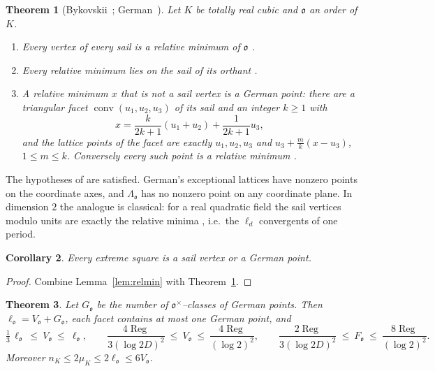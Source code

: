 \documentclass[11pt,reqno]{amsart}
\theoremstyle{plain}
\newtheorem{theorem}{Theorem}[section]
\newtheorem{corollary}[theorem]{Corollary}
\theoremstyle{definition}
\newcommand{\conv}{\operatorname{conv}}
\newcommand{\Reg}{\operatorname{Reg}}
\newcommand{\Ok}{\mathfrak{o}}
\newcommand{\nK}{n_K}
\newcommand{\muK}{\mu_K}
\begin{document}
\begin{theorem}[Bykovskii~\cite{Bykovskii}; German~\cite{German}]\label{thm:bg}
Let $K$ be totally real cubic and $\Ok$ an order of $K$.
\begin{enumerate}[label=\textup{(\alph*)},leftmargin=2.2em]
\item Every vertex of every sail is a relative minimum of $\Ok$ \textup{\cite[Theorem]{Bykovskii}}.
\item Every relative minimum lies on the sail of its orthant \textup{\cite[Thm.~1]{German}}.
\item A relative minimum $x$ that is not a sail vertex is a \emph{German point}: there are a triangular facet
$\conv(u_1,u_2,u_3)$ of its sail and an integer $k\ge1$ with
\[
x=\frac{k}{2k+1}(u_1+u_2)+\frac1{2k+1}u_3,
\]
and the lattice points of the facet are exactly $u_1,u_2,u_3$ and $u_3+\tfrac mk(x-u_3)$, $1\le m\le k$.
Conversely every such point is a relative minimum \textup{\cite[Cor.~2, Thm.~2, Cor.~3]{German}}.
\end{enumerate}
\end{theorem}

The hypotheses of \cite[Thm.~1, Cor.~3]{German} are satisfied. German's exceptional lattices have
nonzero points on the coordinate axes, and $\Lambda_\Ok$ has no nonzero point on any coordinate plane.
In dimension $2$ the analogue is classical: for a real quadratic field the sail vertices modulo units are
exactly the relative minima \cite{Bykovskii}, i.e.\ the $\ell_d$ convergents of one period.

\begin{corollary}\label{cor:extsail}
Every extreme square is a sail vertex or a German point.
\end{corollary}

\begin{proof}
Combine Lemma~\ref{lem:relmin} with Theorem~\ref{thm:bg}.
\end{proof}

\begin{theorem}\label{thm:sails}
Let $G_\Ok$ be the number of $\Ok^\times$--classes of German points. Then $\ell_\Ok=V_\Ok+G_\Ok$, each facet
contains at most one German point, and
\[
\tfrac13\,\ell_\Ok\ \le\ V_\Ok\ \le\ \ell_\Ok,\qquad
\frac{4\Reg}{3(\log2D)^2}\ \le\ V_\Ok\ \le\ \frac{4\Reg}{(\log2)^2},\qquad
\frac{2\Reg}{3(\log2D)^2}\ \le\ F_\Ok\ \le\ \frac{8\Reg}{(\log2)^2}.
\]
Moreover $\nK\le2\muK\le2\ell_\Ok\le6V_\Ok$.
\end{theorem}
\end{document}
